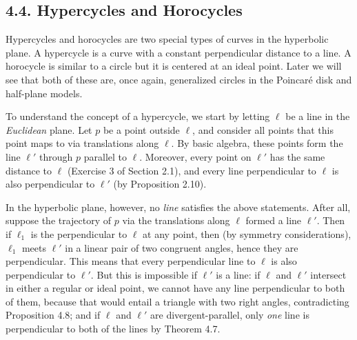 \documentclass[leqno]{book}
\begin{document}
\subsection*{4.4. Hypercycles and Horocycles}
Hypercycles and horocycles are two special types of curves in the hyperbolic plane.  A hypercycle is a curve with a constant perpendicular distance to a line.  A horocycle is similar to a circle but it is centered at an ideal point.  Later we will see that both of these are, once again, generalized circles in the Poincar\'e disk and half-plane models.

To understand the concept of a hypercycle, we start by letting $\ell$ be a line in the \emph{Euclidean} plane.  Let $p$ be a point outside $\ell$, and consider all points that this point maps to via translations along $\ell$.  By basic algebra, these points form the line $\ell'$ through $p$ parallel to $\ell$.  Moreover, every point on $\ell'$ has the same distance to $\ell$ (Exercise 3 of Section 2.1), and every line perpendicular to $\ell$ is also perpendicular to $\ell'$ (by Proposition 2.10).

In the hyperbolic plane, however, no \emph{line} satisfies the above statements.  After all, suppose the trajectory of $p$ via the translations along $\ell$ formed a line $\ell'$.  Then if $\ell_1$ is the perpendicular to $\ell$ at any point, then (by symmetry considerations), $\ell_1$ meets $\ell'$ in a linear pair of two congruent angles, hence they are perpendicular.  This means that every perpendicular line to $\ell$ is also perpendicular to $\ell'$.  But this is impossible if $\ell'$ is a line: if $\ell$ and $\ell'$ intersect in either a regular or ideal point, we cannot have any line perpendicular to both of them, because that would entail a triangle with two right angles, contradicting Proposition 4.8; and if $\ell$ and $\ell'$ are divergent-parallel, only \emph{one} line is perpendicular to both of the lines by Theorem 4.7.
\end{document}
